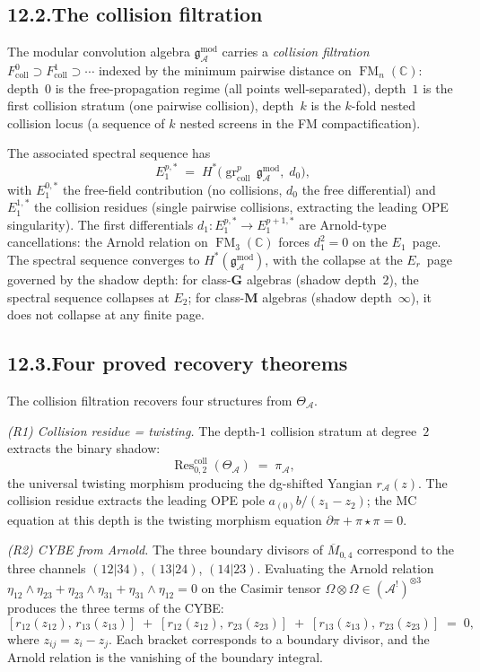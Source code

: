 \documentclass[11pt]{report}
\theoremstyle{definition}
\theoremstyle{remark}
\providecommand{\cA}{\mathcal{A}}
\numberwithin{equation}{section}
\begin{document}
\subsection*{12.2.\enspace The collision filtration}

The modular convolution algebra $\mathfrak g^{\mathrm{mod}}_\cA$
carries a \emph{collision filtration}
$F^0_{\mathrm{coll}}\supset F^1_{\mathrm{coll}}\supset\cdots$
indexed by the minimum pairwise distance on
$\operatorname{FM}_n(\mathbb C)$: depth~$0$ is the
free-propagation regime (all points well-separated), depth~$1$ is
the first collision stratum (one pairwise collision), depth~$k$
is the $k$-fold nested collision locus (a sequence of $k$ nested
screens in the FM compactification).

The associated spectral sequence has
\[
E_1^{p,*}
\;=\;
H^*\!\bigl(\operatorname{gr}_{\mathrm{coll}}^p\,
\mathfrak g^{\mathrm{mod}}_\cA,\;d_0\bigr),
\]
with $E_1^{0,*}$ the free-field contribution (no collisions,
$d_0$ the free differential) and $E_1^{1,*}$ the collision
residues (single pairwise collisions, extracting the leading
OPE singularity). The first differentials $d_1\colon
E_1^{p,*}\to E_1^{p+1,*}$ are Arnold-type cancellations: the
Arnold relation on $\operatorname{FM}_3(\mathbb C)$ forces
$d_1^2=0$ on the $E_1$~page. The spectral sequence converges
to $H^*(\mathfrak g^{\mathrm{mod}}_\cA)$, with the collapse at
the $E_r$~page governed by the shadow depth: for
class-$\mathbf{G}$ algebras (shadow depth~$2$), the spectral sequence
collapses at $E_2$; for class-$\mathbf{M}$ algebras
(shadow depth~$\infty$), it does not collapse at any finite page.

\subsection*{12.3.\enspace Four proved recovery theorems}

The collision filtration recovers four structures from $\Theta_\cA$.

\medskip
\noindent\emph{(R1) Collision residue = twisting.}
The depth-$1$ collision stratum at degree~$2$ extracts the binary
shadow:
\[
\operatorname{Res}^{\mathrm{coll}}_{0,2}(\Theta_\cA)
\;=\;\pi_\cA,
\]
the universal twisting morphism producing the
dg-shifted Yangian $r_\cA(z)$. The collision
residue extracts the leading OPE pole
$a_{(0)}b/(z_1-z_2)$; the MC equation at this depth is the
twisting morphism equation
$\partial\pi+\pi\star\pi=0$.

\medskip
\noindent\emph{(R2) CYBE from Arnold.}
The three boundary divisors of $\overline M_{0,4}$ correspond
to the three channels $(12|34)$, $(13|24)$, $(14|23)$. Evaluating
the Arnold relation $\eta_{12}\wedge\eta_{23}+\eta_{23}\wedge\eta_{31}
+\eta_{31}\wedge\eta_{12}=0$ on the Casimir tensor
$\Omega\otimes\Omega\in(\cA^!)^{\otimes 3}$ produces the three
terms of the CYBE:
\[
[r_{12}(z_{12}),\,r_{13}(z_{13})]
\;+\;
[r_{12}(z_{12}),\,r_{23}(z_{23})]
\;+\;
[r_{13}(z_{13}),\,r_{23}(z_{23})]
\;=\;0,
\]
where $z_{ij}=z_i-z_j$. Each bracket corresponds to a boundary
divisor, and the Arnold relation is the vanishing of the boundary
integral.
\end{document}
